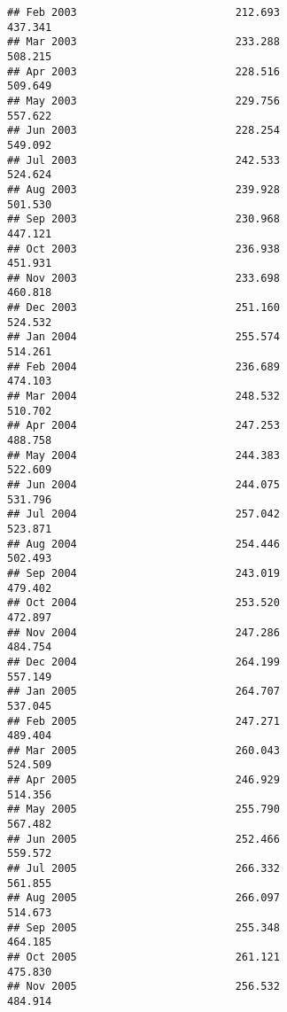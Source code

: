 \documentclass[
]{article}
\begin{document}
\begin{verbatim}
## Feb 2003                         212.693                           437.341
## Mar 2003                         233.288                           508.215
## Apr 2003                         228.516                           509.649
## May 2003                         229.756                           557.622
## Jun 2003                         228.254                           549.092
## Jul 2003                         242.533                           524.624
## Aug 2003                         239.928                           501.530
## Sep 2003                         230.968                           447.121
## Oct 2003                         236.938                           451.931
## Nov 2003                         233.698                           460.818
## Dec 2003                         251.160                           524.532
## Jan 2004                         255.574                           514.261
## Feb 2004                         236.689                           474.103
## Mar 2004                         248.532                           510.702
## Apr 2004                         247.253                           488.758
## May 2004                         244.383                           522.609
## Jun 2004                         244.075                           531.796
## Jul 2004                         257.042                           523.871
## Aug 2004                         254.446                           502.493
## Sep 2004                         243.019                           479.402
## Oct 2004                         253.520                           472.897
## Nov 2004                         247.286                           484.754
## Dec 2004                         264.199                           557.149
## Jan 2005                         264.707                           537.045
## Feb 2005                         247.271                           489.404
## Mar 2005                         260.043                           524.509
## Apr 2005                         246.929                           514.356
## May 2005                         255.790                           567.482
## Jun 2005                         252.466                           559.572
## Jul 2005                         266.332                           561.855
## Aug 2005                         266.097                           514.673
## Sep 2005                         255.348                           464.185
## Oct 2005                         261.121                           475.830
## Nov 2005                         256.532                           484.914

\end{verbatim}
\end{document}
